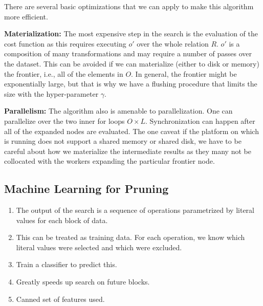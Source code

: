 There are several basic optimizations that we can apply to make this algorithm more efficient.

\vspace{0.25em}\noindent\textbf{Materialization: } The most expensive step in the search is the evaluation of the cost function as this requires executing $o'$ over the whole relation $R$. $o'$ is a composition of many transformations and may require a number of passes over the dataset.
This can be avoided if we can materialize (either to disk or memory) the frontier, i.e., all of the elements in $O$.
In general, the frontier might be exponentially large, but that is why we have a flushing procedure that limits the size with the hyper-parameter $\gamma$.

\vspace{0.25em}\noindent\textbf{Parallelism: } The algorithm also is amenable to parallelization. One can parallelize over the two inner for loops $O \times L$. Synchronization can happen after all of the expanded nodes are evaluated.
The one caveat if the platform on which \sys is running does not support a shared memory or shared disk, we have to be careful about how we materialize the intermediate results as they many not be collocated with the workers expanding the particular frontier node.

\subsection{Machine Learning for Pruning}

\begin{enumerate}
    \item The output of the search is a sequence of operations parametrized by literal values for each block of data.
    \item This can be treated as training data. For each operation, we know which literal values were selected and which were excluded. 
    \item Train a classifier to predict this.
    \item Greatly speeds up search on future blocks.
    \item Canned set of features used.
    
\end{enumerate}

